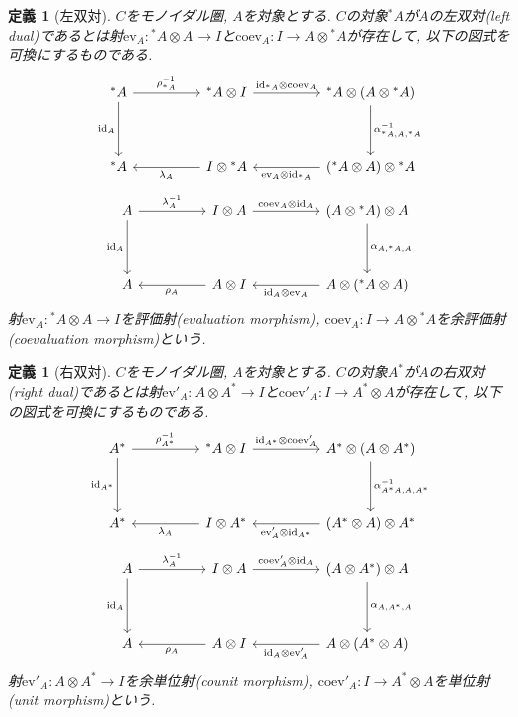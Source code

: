 \documentclass[a4paper,12pt]{ltjsarticle}
\theoremstyle{break}
\newtheorem{defn}[thm]{定義}
\newcommand{\id}{\mathrm{id}}
\newcommand{\eva}{\mathrm{ev}}
\newcommand{\coev}{\mathrm{coev}}
\newcommand{\al}{\alpha}
\newcommand{\la}{\lambda}
\newcommand{\ot}{\otimes}
\numberwithin{equation}{section}
\begin{document}
\begin{defn}[左双対]
  $C$をモノイダル圏, $A$を対象とする. 
  $C$の対象${}^*A$が$A$の左双対(left dual)であるとは射$\eva_A: {}^*A \ot A \to I$と$\coev_A: I \to A \ot {}^*A$が存在して, 以下の図式を可換にするものである. 
  \[\begin{tikzcd}
    {}^*A && {{}^*A \ot I} && {{}^*A \ot (A \ot {}^*A)} \\
    \\
    {}^*A && {I \ot {}^*A} && {({}^*A \ot A) \ot {}^*A}
    \arrow["{\rho_{{}^*A}^{-1}}", from=1-1, to=1-3]
    \arrow["{\id_{{}^*A} \ot \coev_A}", from=1-3, to=1-5]
    \arrow["{\id_A}"', from=1-1, to=3-1]
    \arrow["{\la_A}", from=3-3, to=3-1]
    \arrow["{\eva_A \ot \id_{{}^*A}}", from=3-5, to=3-3]
    \arrow["{\al_{{}^*A,A,{}^*A}^{-1}}", from=1-5, to=3-5]
  \end{tikzcd}\]
  \[\begin{tikzcd}
    A && {I \ot A} && {(A \ot {}^*A) \ot A} \\
    \\
    A && {A \ot I} && {A \ot ({}^*A \ot A)}
    \arrow["{\la_A^{-1}}", from=1-1, to=1-3]
    \arrow["{\coev_A \ot \id_A }", from=1-3, to=1-5]
    \arrow["{\id_A}"', from=1-1, to=3-1]
    \arrow["{\rho_A}", from=3-3, to=3-1]
    \arrow["{\id_A \ot \eva_A}", from=3-5, to=3-3]
    \arrow["{\al_{A,{}^*A,A}}", from=1-5, to=3-5]
  \end{tikzcd}\]
  射$\eva_A: {}^*A \ot A \to I$を評価射(evaluation morphism), $\coev_A: I \to A \ot {}^*A$を余評価射(coevaluation morphism)という. 
\end{defn}

\begin{defn}[右双対]
  $C$をモノイダル圏, $A$を対象とする. 
  $C$の対象$A^*$が$A$の右双対(right dual)であるとは射$\eva'_A: A \ot A^* \to I$と$\coev'_A: I \to A^* \ot A$が存在して, 以下の図式を可換にするものである. 
  \[\begin{tikzcd}
    A^* && {{}^*A \ot I} && {A^* \ot (A \ot A^*)} \\
    \\
    A^* && {I \ot A^*} && {(A^* \ot A) \ot A^*}
    \arrow["{\rho_{A^*}^{-1}}", from=1-1, to=1-3]
    \arrow["{\id_{A^*} \ot \coev'_A}", from=1-3, to=1-5]
    \arrow["{\id_{A^*}}"', from=1-1, to=3-1]
    \arrow["{\la_A}", from=3-3, to=3-1]
    \arrow["{\eva'_A \ot \id_{A^*}}", from=3-5, to=3-3]
    \arrow["{\al_{A^*A,A,A^*}^{-1}}", from=1-5, to=3-5]
  \end{tikzcd}\]
  \[\begin{tikzcd}
    A && {I \ot A} && {(A \ot A^*) \ot A} \\
    \\
    A && {A \ot I} && {A \ot (A^* \ot A)}
    \arrow["{\la_A^{-1}}", from=1-1, to=1-3]
    \arrow["{\coev'_A \ot \id_A}", from=1-3, to=1-5]
    \arrow["{\id_A}"', from=1-1, to=3-1]
    \arrow["{\rho_A}", from=3-3, to=3-1]
    \arrow["{\id_A \ot \eva'_A}", from=3-5, to=3-3]
    \arrow["{\al_{A,A^*,A}}", from=1-5, to=3-5]
  \end{tikzcd}\]
  射$\eva'_A: A \ot A^* \to I$を余単位射(counit morphism), $\coev'_A: I \to A^* \ot A$を単位射(unit morphism)という. 
\end{defn}
\end{document}
